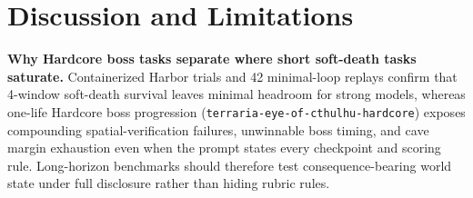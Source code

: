 \documentclass[10pt,letterpaper]{article}
\begin{document}
\section{Discussion and Limitations}

\textbf{Why Hardcore boss tasks separate where short soft-death tasks saturate.} Containerized Harbor trials and 42 minimal-loop replays confirm that 4-window soft-death survival leaves minimal headroom for strong models, whereas one-life Hardcore boss progression (\texttt{terraria-eye-of-cthulhu-hardcore}) exposes compounding spatial-verification failures, unwinnable boss timing, and cave margin exhaustion even when the prompt states every checkpoint and scoring rule. Long-horizon benchmarks should therefore test consequence-bearing world state under full disclosure rather than hiding rubric rules.
\end{document}
